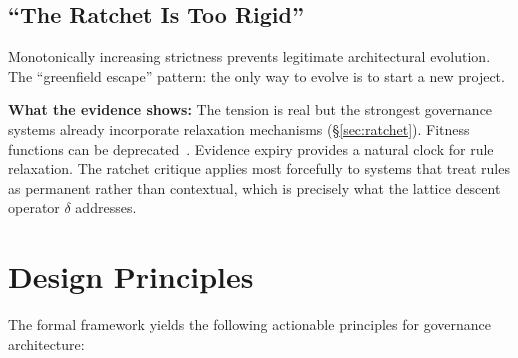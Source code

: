 \documentclass[11pt, a4paper, copyright]{googledeepmind}
\begin{document}
\subsection{``The Ratchet Is Too Rigid''}

Monotonically increasing strictness prevents legitimate architectural evolution. The ``greenfield escape'' pattern: the only way to evolve is to start a new project.

\textbf{What the evidence shows:} The tension is real but the strongest governance systems already incorporate relaxation mechanisms (\S\ref{sec:ratchet}). Fitness functions can be deprecated~\citep{ford2017}. Evidence expiry provides a natural clock for rule relaxation. The ratchet critique applies most forcefully to systems that treat rules as permanent rather than contextual, which is precisely what the lattice descent operator $\delta$ addresses.


\section{Design Principles}
\label{sec:principles}

The formal framework yields the following actionable principles for governance architecture:
\end{document}
